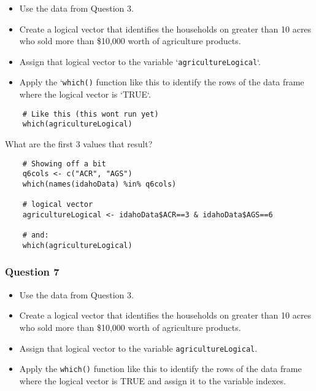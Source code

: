 \documentclass{beamer}
\begin{document}
\begin{frame}
\begin{itemize}
	\item Use the data from Question 3. 
	\item Create a logical vector that identifies the households on greater than 10 acres who sold more than \$10,000 worth of agriculture products. 
	\item Assign that logical vector to the variable `\texttt{agricultureLogical}`. 
	\item Apply the `\texttt{which()} function like this to identify the rows of the data frame where the logical vector is `TRUE`.
\end{itemize}

\end{frame}
\begin{frame}[fragile]
\begin{framed} 
	\begin{verbatim}
	# Like this (this wont run yet)
	which(agricultureLogical) 
	\end{verbatim}
\end{framed} 
\end{frame}
\begin{frame}[fragile]
What are the first 3 values that result?

\begin{framed}
\begin{verbatim}
	# Showing off a bit
	q6cols <- c("ACR", "AGS")
	which(names(idahoData) %in% q6cols)  
	
	# logical vector
	agricultureLogical <- idahoData$ACR==3 & idahoData$AGS==6
	
	# and:
	which(agricultureLogical) 
	\end{verbatim}
\end{framed} 

\end{frame}
\begin{frame}
	
\frametitle{Question 7}

\begin{itemize}
	\item Use the data from Question 3. 
	\item Create a logical vector that identifies the households on greater than 10 acres who
	sold more than \$10,000 worth of agriculture products. 
	\item Assign that logical vector to the variable \texttt{agricultureLogical}. 
	\item Apply the \texttt{which()} function like this to identify the rows of the 
	data frame where the logical vector is TRUE and assign it to the variable indexes. 
\end{itemize}

\end{frame}
\end{document}
